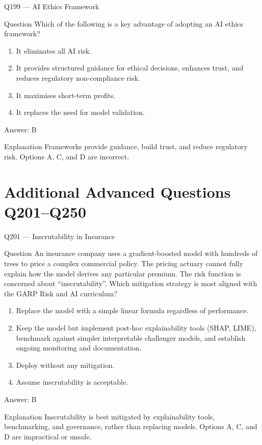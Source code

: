 \documentclass[aspectratio=169,8pt]{beamer}
\begin{document}
\begin{frame}{Q199 --- AI Ethics Framework}
\begin{block}{Question}
Which of the following is a key advantage of adopting an AI ethics framework?
\begin{enumerate}
\item It eliminates all AI risk.
\item It provides structured guidance for ethical decisions, enhances trust, and reduces regulatory non-compliance risk.
\item It maximises short-term profits.
\item It replaces the need for model validation.
\end{enumerate}  \end{block}
\begin{exampleblock}{Answer: B}\end{exampleblock}
\begin{block}{Explanation}
Frameworks provide guidance, build trust, and reduce regulatory risk. Options A, C, and D are incorrect.
\end{block}
\end{frame}


\section{Additional Advanced Questions Q201--Q250}

\begin{frame}{Q201 --- Inscrutability in Insurance}
\begin{block}{Question}
An insurance company uses a gradient-boosted model with hundreds of trees to price a complex commercial policy. The pricing actuary cannot fully explain how the model derives any particular premium. The risk function is concerned about ``inscrutability''. Which mitigation strategy is most aligned with the GARP Risk and AI curriculum?

\begin{enumerate}
\item Replace the model with a simple linear formula regardless of performance.
\item Keep the model but implement post-hoc explainability tools (SHAP, LIME), benchmark against simpler interpretable challenger models, and establish ongoing monitoring and documentation.
\item Deploy without any mitigation.
\item Assume inscrutability is acceptable.
\end{enumerate}  \end{block}
\begin{exampleblock}{Answer: B}\end{exampleblock}
\begin{block}{Explanation}
Inscrutability is best mitigated by explainability tools, benchmarking, and governance, rather than replacing models. Options A, C, and D are impractical or unsafe.
\end{block}
\end{frame}
\end{document}
